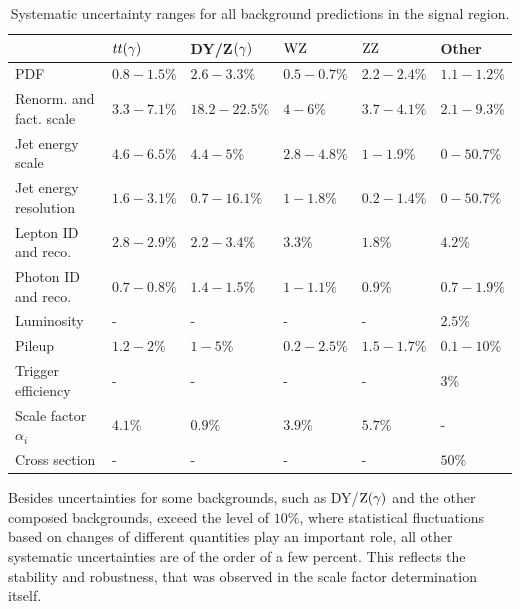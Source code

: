 \begin{table}[tbp]
 \centering
 \caption{Systematic uncertainty ranges for all background predictions in the signal region.}
 \small
 \label{tab:systuncBKG}
 \begin{tabular}[width=\textwidth]{llllll}
                            & $tt(\gamma)$  & DY/Z$(\gamma)$  & $\mathrm{W}\mathrm{Z}$    & $\mathrm{Z}\mathrm{Z}$    & Other       \\\hline
  PDF                       & $0.8-1.5\%$ & $2.6-3.3\%$   & $0.5-0.7\%$ & $2.2-2.4\%$ & $1.1-1.2\%$ \\
  Renorm. and fact. scale   & $3.3-7.1\%$ & $18.2-22.5\%$ & $4-6\%$     & $3.7-4.1\%$ & $2.1-9.3\%$ \\
  Jet energy scale          & $4.6-6.5\%$ & $4.4-5\%$     & $2.8-4.8\%$ & $1-1.9\%$   & $0-50.7\%$  \\
  Jet energy resolution     & $1.6-3.1\%$ & $0.7-16.1\%$  & $1-1.8\%$   & $0.2-1.4\%$ & $0-50.7\%$  \\
  Lepton ID and reco.       & $2.8-2.9\%$ & $2.2-3.4\%$   & $3.3\%$     & $1.8\%$     & $4.2\%$     \\
  Photon ID and reco.       & $0.7-0.8\%$ & $1.4-1.5\%$   & $1-1.1\%$   & $0.9\%$     & $0.7-1.9\%$ \\
  Luminosity                & -           & -             & -           & -           & $2.5\%$     \\
  Pileup                    & $1.2-2\%$   & $1-5\%$       & $0.2-2.5\%$ & $1.5-1.7\%$ & $0.1-10\%$  \\
  Trigger efficiency        & -           & -             & -           & -           & $3\%$       \\
  Scale factor $\alpha_{i}$ & $4.1\%$     & $0.9\%$       & $3.9\%$     & $5.7\%$     & -           \\
  Cross section             & -           & -             & -           & -           & $50\%$      \\
  \hline
 \end{tabular}
 \vspace{\baselineskip}
\end{table}
Besides uncertainties for some backgrounds, such as DY/$\mathrm{Z}(\gamma)$ and the other composed backgrounds, exceed the level of $10\%$, where statistical fluctuations based on changes of different quantities play an important role, all other systematic uncertainties are of the order of a few percent. This reflects the stability and robustness, that was observed in the scale factor determination itself.


